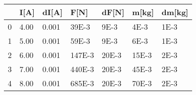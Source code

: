 \begin{tabular}{lllllll}
\toprule
{} &  I[A] &  dI[A] &    F[N] &  dF[N] &  m[kg] & dm[kg] \\
\midrule
0 &  4.00 &  0.001 &   39E-3 &   9E-3 &   4E-3 &   1E-3 \\
1 &  5.00 &  0.001 &   59E-3 &   9E-3 &   6E-3 &   1E-3 \\
2 &  6.00 &  0.001 &  147E-3 &  20E-3 &  15E-3 &   2E-3 \\
3 &  7.00 &  0.001 &  440E-3 &  20E-3 &  45E-3 &   2E-3 \\
4 &  8.00 &  0.001 &  685E-3 &  20E-3 &  70E-3 &   2E-3 \\
\bottomrule
\end{tabular}
